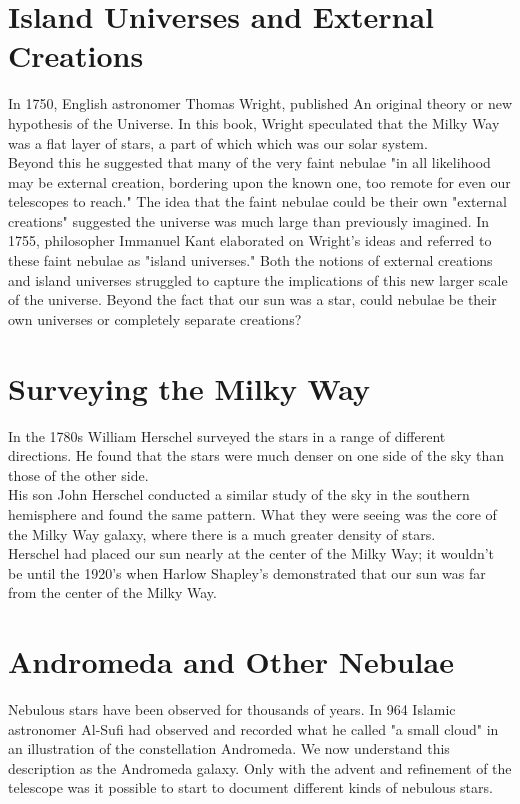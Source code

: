 \documentclass[18pt a4 paper]{article}
\begin{document}
\section{Island Universes and External Creations}
In 1750, English astronomer Thomas Wright, published An original theory or new hypothesis of the Universe.  In this book, Wright speculated that the Milky Way was a flat layer of stars, a part of which which was our solar system.\\

Beyond this he suggested that many of the very faint nebulae "in all likelihood may be external creation, bordering upon the known one, too remote for even our telescopes to reach." The idea that the faint nebulae could be their own "external creations" suggested the universe was much large than previously imagined. In 1755, philosopher Immanuel Kant elaborated on Wright's ideas and referred to these faint nebulae as "island universes." Both the notions of external creations and island universes struggled to capture the implications of this new larger scale of the universe. Beyond the fact that our sun was a star, could nebulae be their own universes or completely separate creations?

\section{Surveying the Milky Way}
In the 1780s William Herschel surveyed the stars in a range of different directions. He found that the stars were much denser on one side of the sky than those of the other side.\\

His son John Herschel conducted a similar study of the sky in the southern hemisphere and found the same pattern. What they were seeing was the core of the Milky Way galaxy, where there is a much greater density of stars.\\

Herschel had placed our sun nearly at the center of the Milky Way; it wouldn't be until the 1920's when Harlow Shapley's demonstrated that our sun was far from the center of the Milky Way.

\section{Andromeda and Other Nebulae}
Nebulous stars have been observed for thousands of years. In 964 Islamic astronomer Al-Sufi had observed and recorded what he called "a small cloud" in an illustration of the constellation Andromeda. We now understand this description as the Andromeda galaxy. Only with the advent and refinement of the telescope was it possible to start to document different kinds of nebulous stars.\\
\end{document}
